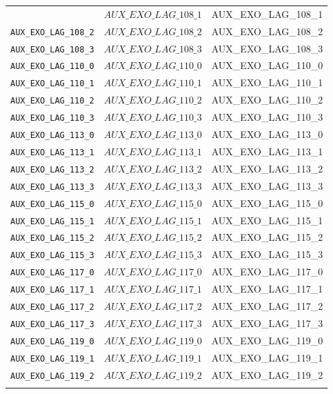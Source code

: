 \begin{center}
\begin{longtable}{ccc}
{\texttt{AUX\_EXO\_LAG\_108\_1} & $AUX\_EXO\_LAG\_108\_1$ & AUX\_EXO\_LAG\_108\_1\\
\texttt{AUX\_EXO\_LAG\_108\_2} & $AUX\_EXO\_LAG\_108\_2$ & AUX\_EXO\_LAG\_108\_2\\
\texttt{AUX\_EXO\_LAG\_108\_3} & $AUX\_EXO\_LAG\_108\_3$ & AUX\_EXO\_LAG\_108\_3\\
\texttt{AUX\_EXO\_LAG\_110\_0} & $AUX\_EXO\_LAG\_110\_0$ & AUX\_EXO\_LAG\_110\_0\\
\texttt{AUX\_EXO\_LAG\_110\_1} & $AUX\_EXO\_LAG\_110\_1$ & AUX\_EXO\_LAG\_110\_1\\
\texttt{AUX\_EXO\_LAG\_110\_2} & $AUX\_EXO\_LAG\_110\_2$ & AUX\_EXO\_LAG\_110\_2\\
\texttt{AUX\_EXO\_LAG\_110\_3} & $AUX\_EXO\_LAG\_110\_3$ & AUX\_EXO\_LAG\_110\_3\\
\texttt{AUX\_EXO\_LAG\_113\_0} & $AUX\_EXO\_LAG\_113\_0$ & AUX\_EXO\_LAG\_113\_0\\
\texttt{AUX\_EXO\_LAG\_113\_1} & $AUX\_EXO\_LAG\_113\_1$ & AUX\_EXO\_LAG\_113\_1\\
\texttt{AUX\_EXO\_LAG\_113\_2} & $AUX\_EXO\_LAG\_113\_2$ & AUX\_EXO\_LAG\_113\_2\\
\texttt{AUX\_EXO\_LAG\_113\_3} & $AUX\_EXO\_LAG\_113\_3$ & AUX\_EXO\_LAG\_113\_3\\
\texttt{AUX\_EXO\_LAG\_115\_0} & $AUX\_EXO\_LAG\_115\_0$ & AUX\_EXO\_LAG\_115\_0\\
\texttt{AUX\_EXO\_LAG\_115\_1} & $AUX\_EXO\_LAG\_115\_1$ & AUX\_EXO\_LAG\_115\_1\\
\texttt{AUX\_EXO\_LAG\_115\_2} & $AUX\_EXO\_LAG\_115\_2$ & AUX\_EXO\_LAG\_115\_2\\
\texttt{AUX\_EXO\_LAG\_115\_3} & $AUX\_EXO\_LAG\_115\_3$ & AUX\_EXO\_LAG\_115\_3\\
\texttt{AUX\_EXO\_LAG\_117\_0} & $AUX\_EXO\_LAG\_117\_0$ & AUX\_EXO\_LAG\_117\_0\\
\texttt{AUX\_EXO\_LAG\_117\_1} & $AUX\_EXO\_LAG\_117\_1$ & AUX\_EXO\_LAG\_117\_1\\
\texttt{AUX\_EXO\_LAG\_117\_2} & $AUX\_EXO\_LAG\_117\_2$ & AUX\_EXO\_LAG\_117\_2\\
\texttt{AUX\_EXO\_LAG\_117\_3} & $AUX\_EXO\_LAG\_117\_3$ & AUX\_EXO\_LAG\_117\_3\\
\texttt{AUX\_EXO\_LAG\_119\_0} & $AUX\_EXO\_LAG\_119\_0$ & AUX\_EXO\_LAG\_119\_0\\
\texttt{AUX\_EXO\_LAG\_119\_1} & $AUX\_EXO\_LAG\_119\_1$ & AUX\_EXO\_LAG\_119\_1\\
\texttt{AUX\_EXO\_LAG\_119\_2} & $AUX\_EXO\_LAG\_119\_2$ & AUX\_EXO\_LAG\_119\_2\\
}
\end{longtable}
\end{center}
